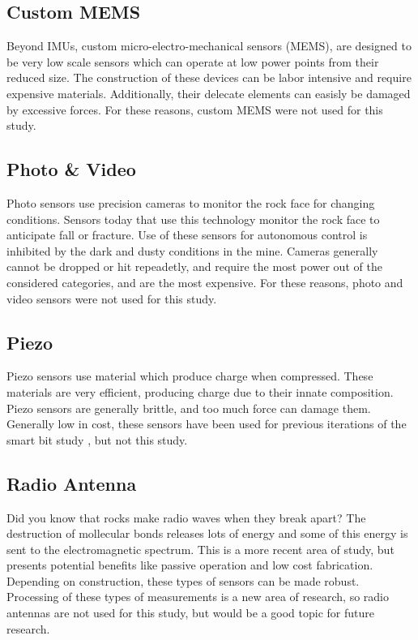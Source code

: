 \subsection{Custom MEMS}
Beyond IMUs, custom micro-electro-mechanical sensors (MEMS), are designed to be very low scale
sensors which can operate at low power points from their reduced size. The construction of these
devices can be labor intensive and require expensive materials. Additionally, their delecate elements
can easisly be damaged by excessive forces. For these reasons, custom MEMS were not used for this study.

\subsection{Photo \& Video}
Photo sensors use precision cameras to monitor the rock face for changing conditions.
Sensors today that use this technology monitor the rock face to anticipate fall or fracture.
Use of these sensors for autonomous control is inhibited by the dark and dusty conditions in the mine.
Cameras generally cannot be dropped or hit repeadetly, and require the most power out of the considered categories,
and are the most expensive. For these reasons, photo and video sensors were not used for this study.

\subsection{Piezo}
Piezo sensors use material which produce charge when compressed. 
These materials are very efficient, producing charge due to their innate composition.
Piezo sensors are generally brittle, and too much force can damage them.
Generally low in cost, these sensors have been used for 
previous iterations of the smart bit study \cite{11124/170545}, but not this study.

\subsection{Radio Antenna}
Did you know that rocks make radio waves when they break apart? 
The destruction of mollecular bonds releases lots of energy
 and some of this energy is sent to the electromagnetic spectrum.
This is a more recent area of study, but presents potential benefits like
passive operation and low cost fabrication. 
Depending on construction, these types of sensors can be made robust.
Processing of these types of measurements is a new area of research,
so radio antennas are not used for this study, 
but would be a good topic for future research.


